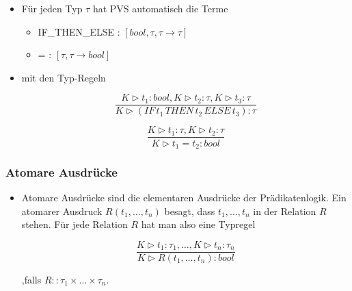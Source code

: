 \documentclass{scrartcl}
\begin{document}
\begin{itemize}
	\item Für jeden Typ $ \tau $ hat PVS automatisch die Terme
	\begin{itemize}
		\item IF\_THEN\_ELSE : $ [bool, \tau, \tau \rightarrow \tau] $
		\item = : $ [\tau, \tau \rightarrow bool] $
	\end{itemize}
	\item mit den Typ-Regeln \\
	
	\begin{minipage}{.5\linewidth}
		\begin{equation*}
		\frac{K \triangleright t_1 : bool, K \triangleright t_2 : \tau, K \triangleright t_3 : \tau}{K \triangleright (IF \, t_1 \, THEN \, t_2 \, ELSE \, t_3) : \tau}
		\end{equation*}
	\end{minipage}
	\begin{minipage}{.5\linewidth}
		\begin{equation*}
		\frac{K \triangleright t_1 : \tau, K \triangleright t_2 : \tau}{K \triangleright t_1 = t_2 : bool}
		\end{equation*}
	\end{minipage}
\end{itemize}

\subsubsection{Atomare Ausdrücke}

\begin{itemize}
	\item Atomare Ausdrücke sind die elementaren Ausdrücke der Prädikatenlogik. Ein atomarer Ausdruck $ R(t_1,\ldots,t_n) $ besagt, dass $ t_1,\ldots,t_n $ in der Relation $ R $ stehen. Für jede Relation $ R $ hat man also eine Typregel \\
	
	\begin{minipage}{.5\linewidth}
		\begin{equation*}
			\frac{K \triangleright t_1 : \tau_1,\ldots,K \triangleright t_n : \tau_n}{K \triangleright R(t_1,\ldots,t_n) : bool}
		\end{equation*}
	\end{minipage}
	\begin{minipage}{.5\linewidth}
		,falls $ R :: \tau_1 \times \ldots \times \tau_n $.
	\end{minipage}
\end{itemize}
\end{document}
